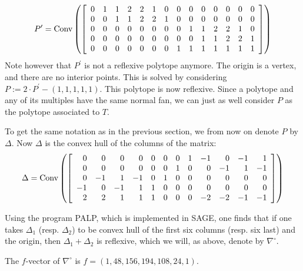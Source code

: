 \documentclass[11pt, english]{article}
\begin{document}
\[
P^\prime = \Conv \left( \left[
\begin{array}{*{14}c}
0 & 1 & 1 & 2 & 2 & 1 & 0 & 0 & 0 & 0 & 0 & 0 & 0 & 0 \\
0 & 0 & 1 & 1 & 2 & 2 & 1 & 0 & 0 & 0 & 0 & 0 & 0 & 0 \\
0 & 0 & 0 & 0 & 0 & 0 & 0 & 0 & 1 & 1 & 2 & 2 & 1 & 0 \\
0 & 0 & 0 & 0 & 0 & 0 & 0 & 0 & 0 & 1 & 1 & 2 & 2 & 1 \\
0 & 0 & 0 & 0 & 0 & 0 & 0 & 1 & 1 & 1 & 1 & 1 & 1 & 1
\end{array} \right] \right)
\]
Note however that $P^\prime$ is not a reflexive polytope anymore. The origin is a vertex, and there are no interior points. This is solved by considering $P := 2 \cdot P^\prime - (1,1,1,1,1)$. This polytope is now reflexive. Since a polytope and any of its multiples have the same normal fan, we can just as well consider $P$ as the polytope associated to $T$.


To get the same notation as in the previous section, we from now on denote $P$ by $\Delta$. Now $\Delta$ is the convex hull of the columns of the matrix:
\[
\Delta = \operatorname{Conv} \left(
\left[\begin{array}{rrrrrrrrrrrr}
0  & 0  & 0 & 0 & 0 & 0 &  0 & 1 & -1 & 0  & -1 & 1 \\
0  & 0  & 0 & 0 & 0 & 0 &  1 & 0 & 0  & -1 & 1  & -1 \\
0  & -1 & 1 & -1& 0 & 1 &  0 & 0 & 0  & 0  & 0  & 0 \\
-1 & 0  &-1 & 1 & 1 & 0 &  0 & 0 & 0  & 0  & 0  & 0 \\
2  & 2  & 1 & 1 & 1 & 0 &  0 & 0 & -2 & -2 & -1 & -1
\end{array}\right]\right)
\]

Using the program PALP, which is implemented in SAGE, one finds that if one takes $\Delta_1$ (resp. $\Delta_2$) to be convex hull of the first six columns (resp. six last) and the origin, then $\Delta_1+\Delta_2$ is reflexive, which we will, as above, denote by $\nabla^\circ$.

\begin{lemma}
  The $f$-vector of $\nabla^\circ$ is $f=(1, 48, 156, 194, 108, 24, 1)$. 
\end{lemma}
\end{document}
